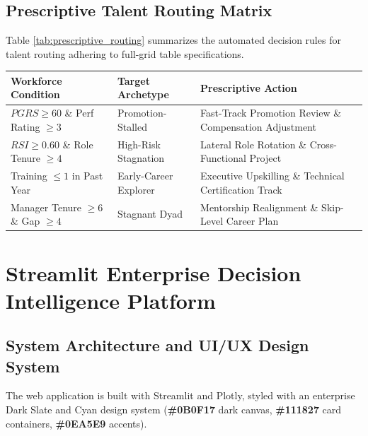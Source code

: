 \documentclass[12pt,a4paper,oneside]{article}
\newcommand{\code}[1]{{\setlength{\fboxsep}{2pt}\colorbox{inlinecodebg}{\small\ttfamily\bfseries#1}}}
\begin{document}
\subsection{Prescriptive Talent Routing Matrix}
Table \ref{tab:prescriptive_routing} summarizes the automated decision rules for talent routing adhering to full-grid table specifications.

\begin{center}
\fontsize{9}{11}\selectfont
\begin{tabular}{|L{3.6cm}|L{3.6cm}|L{6.8cm}|}
\hline
\textbf{Workforce Condition} & \textbf{Target Archetype} & \textbf{Prescriptive Action} \\ \hline
$PGRS \ge 60$ \& Perf Rating $\ge 3$ & Promotion-Stalled & Fast-Track Promotion Review \& Compensation Adjustment \\ \hline
$RSI \ge 0.60$ \& Role Tenure $\ge 4$ & High-Risk Stagnation & Lateral Role Rotation \& Cross-Functional Project \\ \hline
Training $\le 1$ in Past Year & Early-Career Explorer & Executive Upskilling \& Technical Certification Track \\ \hline
Manager Tenure $\ge 6$ \& Gap $\ge 4$ & Stagnant Dyad & Mentorship Realignment \& Skip-Level Career Plan \\ \hline
\end{tabular}
\vspace{0.02in}
\label{tab:prescriptive_routing}
\end{center}

\section{Streamlit Enterprise Decision Intelligence Platform}

\subsection{System Architecture and UI/UX Design System}
The web application is built with Streamlit and Plotly, styled with an enterprise Dark Slate and Cyan design system (\code{\#0B0F17} dark canvas, \code{\#111827} card containers, \code{\#0EA5E9} accents).
\end{document}
